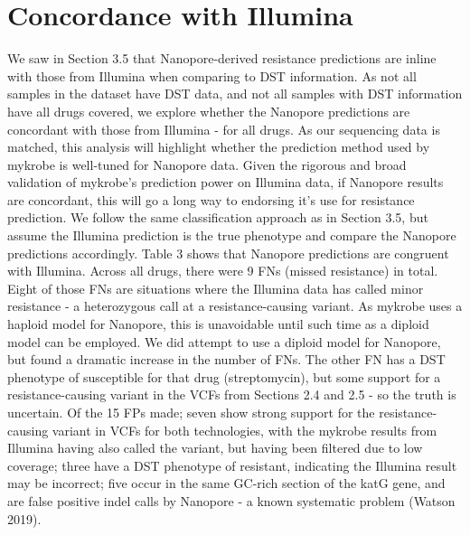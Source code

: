 \section{Concordance with Illumina}

We saw in Section 3.5 that Nanopore-derived resistance predictions are inline with those from Illumina when comparing to DST information. As not all samples in the dataset have DST data, and not all samples with DST information have all drugs covered, we explore whether the Nanopore predictions are concordant with those from Illumina - for all drugs. As our sequencing data is matched, this analysis will highlight whether the prediction method used by mykrobe is well-tuned for Nanopore data. Given the rigorous and broad validation of mykrobe's prediction power on Illumina data, if Nanopore results are concordant, this will go a long way to endorsing it's use for resistance prediction.
We follow the same classification approach as in Section 3.5, but assume the Illumina prediction is the true phenotype and compare the Nanopore predictions accordingly. Table 3 shows that Nanopore predictions are congruent with Illumina.
Across all drugs, there were 9 FNs (missed resistance) in total. Eight of those FNs are situations where the Illumina data has called minor resistance - a heterozygous call at a resistance-causing variant. As mykrobe uses a haploid model for Nanopore, this is unavoidable until such time as a diploid model can be employed. We did attempt to use a diploid model for Nanopore, but found a dramatic increase in the number of FNs. The other FN has a DST phenotype of susceptible for that drug (streptomycin), but some support for a resistance-causing variant in the VCFs from Sections 2.4 and 2.5 - so the truth is uncertain.
Of the 15 FPs made; seven show strong support for the resistance-causing variant in VCFs for both technologies, with the mykrobe results from Illumina having also called the variant, but having been filtered due to low coverage;  three have a DST phenotype of resistant, indicating the Illumina result may be incorrect; five occur in the same GC-rich section of the katG gene, and are false positive indel calls by Nanopore - a known systematic problem (Watson 2019).

